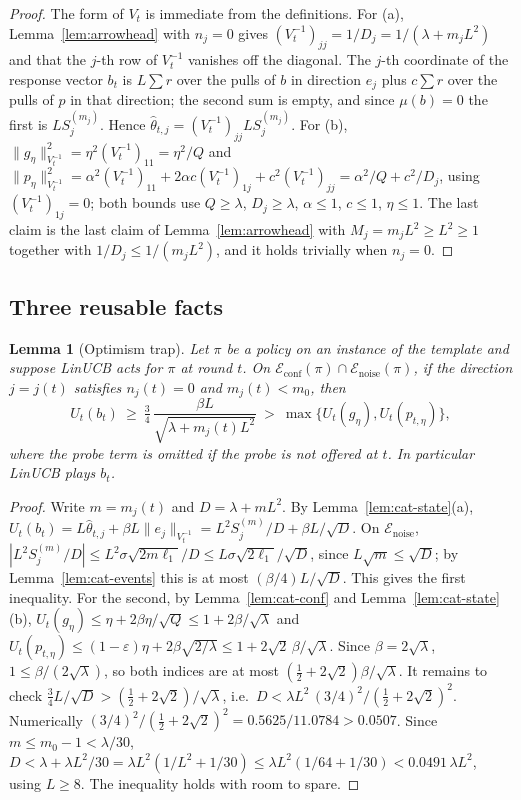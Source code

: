 \documentclass{article}
\newtheorem{lemma}{Lemma}
\theoremstyle{definition}
\theoremstyle{remark}
\newcommand{\eps}{\varepsilon}
\theoremstyle{remark}
\begin{document}
\begin{proof}
The form of $V_t$ is immediate from the definitions. For (a), Lemma~\ref{lem:arrowhead}
with $n_j=0$ gives $(V_t^{-1})_{jj}=1/D_j=1/(\lambda+m_jL^2)$ and that the $j$-th
row of $V_t^{-1}$ vanishes off the diagonal. The $j$-th coordinate of the
response vector $b_t$ is $L\sum r$ over the pulls of $b$ in direction $e_j$
plus $c\sum r$ over the pulls of $p$ in that direction; the second sum is
empty, and since $\mu(b)=0$ the first is $LS_j^{(m_j)}$. Hence
$\widehat\theta_{t,j}=(V_t^{-1})_{jj}LS_j^{(m_j)}$. For (b),
$\|g_\eta\|^2_{V_t^{-1}}=\eta^2(V_t^{-1})_{11}=\eta^2/Q$ and
$\|p_\eta\|^2_{V_t^{-1}}=\alpha^2(V_t^{-1})_{11}+2\alpha c(V_t^{-1})_{1j}+c^2(V_t^{-1})_{jj}
=\alpha^2/Q+c^2/D_j$, using $(V_t^{-1})_{1j}=0$; both bounds use $Q\ge\lambda$,
$D_j\ge\lambda$, $\alpha\le1$, $c\le1$, $\eta\le1$. The last claim is the last
claim of Lemma~\ref{lem:arrowhead} with $M_j=m_jL^2\ge L^2\ge1$ together with
$1/D_j\le1/(m_jL^2)$, and it holds trivially when $n_j=0$.
\end{proof}

\subsection{Three reusable facts}

\begin{lemma}[Optimism trap]
\label{lem:cat-trap}
Let $\pi$ be a policy on an instance of the template and suppose LinUCB acts
for $\pi$ at round $t$. On $\mathcal E_{\mathrm{conf}}(\pi)\cap\mathcal E_{\mathrm{noise}}(\pi)$,
if the direction $j=j(t)$ satisfies $n_j(t)=0$ and $m_j(t)<m_0$, then
\[
U_t(b_t)\ \ge\ \tfrac34\,\frac{\beta L}{\sqrt{\lambda+m_j(t)L^2}}\ >\ \max\{U_t(g_\eta),U_t(p_{t,\eta})\},
\]
where the probe term is omitted if the probe is not offered at $t$. In
particular LinUCB plays $b_t$.
\end{lemma}

\begin{proof}
Write $m=m_j(t)$ and $D=\lambda+mL^2$. By Lemma~\ref{lem:cat-state}(a),
$U_t(b_t)=L\widehat\theta_{t,j}+\beta L\|e_j\|_{V_t^{-1}}=L^2S_j^{(m)}/D+\beta L/\sqrt D$.
On $\mathcal E_{\mathrm{noise}}$, $|L^2S_j^{(m)}/D|\le L^2\sigma\sqrt{2m\ell_1}/D\le L\sigma\sqrt{2\ell_1}/\sqrt D$,
since $L\sqrt m\le\sqrt D$; by Lemma~\ref{lem:cat-events} this is at most
$(\beta/4)L/\sqrt D$. This gives the first inequality. For the second, by
Lemma~\ref{lem:cat-conf} and Lemma~\ref{lem:cat-state}(b),
$U_t(g_\eta)\le\eta+2\beta\eta/\sqrt Q\le1+2\beta/\sqrt\lambda$ and
$U_t(p_{t,\eta})\le(1-\eps)\eta+2\beta\sqrt{2/\lambda}\le1+2\sqrt2\,\beta/\sqrt\lambda$.
Since $\beta=2\sqrt\lambda$, $1\le\beta/(2\sqrt\lambda)$, so both indices are at
most $(\tfrac12+2\sqrt2)\beta/\sqrt\lambda$. It remains to check
$\tfrac34L/\sqrt D>(\tfrac12+2\sqrt2)/\sqrt\lambda$, i.e.\
$D<\lambda L^2\,(3/4)^2/(\tfrac12+2\sqrt2)^2$. Numerically
$(3/4)^2/(\tfrac12+2\sqrt2)^2=0.5625/11.0784>0.0507$. Since $m\le m_0-1<\lambda/30$,
$D<\lambda+\lambda L^2/30=\lambda L^2(1/L^2+1/30)\le\lambda L^2(1/64+1/30)<0.0491\,\lambda L^2$,
using $L\ge8$. The inequality holds with room to spare.
\end{proof}
\end{document}
